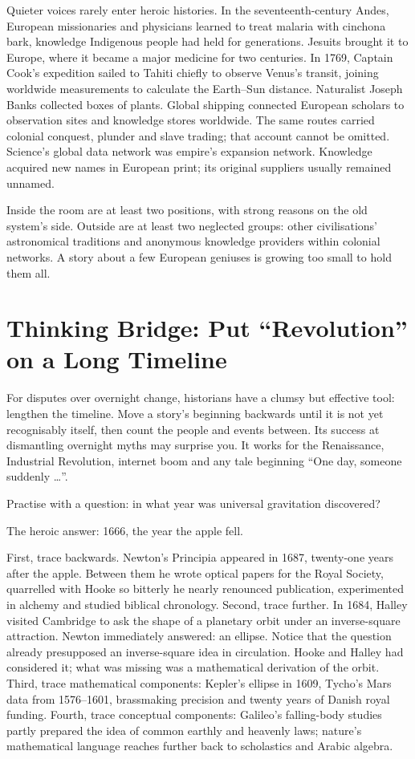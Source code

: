 Quieter voices rarely enter heroic histories. In the seventeenth-century Andes, European missionaries and physicians learned to treat malaria with cinchona bark, knowledge Indigenous people had held for generations. Jesuits brought it to Europe, where it became a major medicine for two centuries. In 1769, Captain Cook's expedition sailed to Tahiti chiefly to observe Venus's transit, joining worldwide measurements to calculate the Earth--Sun distance. Naturalist Joseph Banks collected boxes of plants. Global shipping connected European scholars to observation sites and knowledge stores worldwide. The same routes carried colonial conquest, plunder and slave trading; that account cannot be omitted. Science's global data network was empire's expansion network. Knowledge acquired new names in European print; its original suppliers usually remained unnamed.

Inside the room are at least two positions, with strong reasons on the old system's side. Outside are at least two neglected groups: other civilisations' astronomical traditions and anonymous knowledge providers within colonial networks. A story about a few European geniuses is growing too small to hold them all.

\section[Thinking Bridge: Lengthen the Timeline]{Thinking Bridge: Put ``Revolution'' on a Long Timeline}
For disputes over overnight change, historians have a clumsy but effective tool: lengthen the timeline. Move a story's beginning backwards until it is not yet recognisably itself, then count the people and events between. Its success at dismantling overnight myths may surprise you. It works for the Renaissance, Industrial Revolution, internet boom and any tale beginning ``One day, someone suddenly \ldots''.

Practise with a question: in what year was universal gravitation discovered?

The heroic answer: 1666, the year the apple fell.

First, trace backwards. Newton's Principia appeared in 1687, twenty-one years after the apple. Between them he wrote optical papers for the Royal Society, quarrelled with Hooke so bitterly he nearly renounced publication, experimented in alchemy and studied biblical chronology. Second, trace further. In 1684, Halley visited Cambridge to ask the shape of a planetary orbit under an inverse-square attraction. Newton immediately answered: an ellipse. Notice that the question already presupposed an inverse-square idea in circulation. Hooke and Halley had considered it; what was missing was a mathematical derivation of the orbit. Third, trace mathematical components: Kepler's ellipse in 1609, Tycho's Mars data from 1576--1601, brassmaking precision and twenty years of Danish royal funding. Fourth, trace conceptual components: Galileo's falling-body studies partly prepared the idea of common earthly and heavenly laws; nature's mathematical language reaches further back to scholastics and Arabic algebra.

